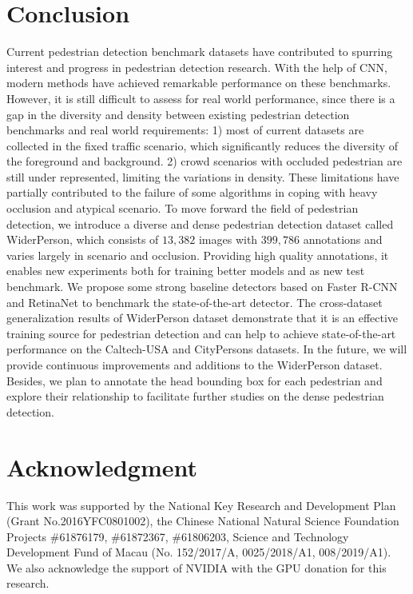 \documentclass[journal]{IEEEtran}
\begin{document}
\section{Conclusion} \label{6}
Current pedestrian detection benchmark datasets have contributed to spurring interest and progress in pedestrian detection research. With the help of CNN, modern methods have achieved remarkable performance on these benchmarks. However, it is still difficult to assess for real world performance, since there is a gap in the diversity and density between existing pedestrian detection benchmarks and real world requirements: 1) most of current datasets are collected in the fixed traffic scenario, which significantly reduces the diversity of the foreground and background. 2) crowd scenarios with occluded pedestrian are still under represented, limiting the variations in density. These limitations have partially contributed to the failure of some algorithms in coping with heavy occlusion and atypical scenario. To move forward the field of pedestrian detection, we introduce a diverse and dense pedestrian detection dataset called WiderPerson, which consists of $13,382$ images with $399,786$ annotations and varies largely in scenario and occlusion. Providing high quality annotations, it enables new experiments both for training better models and as new test benchmark. We propose some strong baseline detectors based on Faster R-CNN and RetinaNet to benchmark the state-of-the-art detector. The cross-dataset generalization results of WiderPerson dataset demonstrate that it is an effective training source for pedestrian detection and can help to achieve state-of-the-art performance on the Caltech-USA and CityPersons datasets. In the future, we will provide continuous improvements and additions to the WiderPerson dataset. Besides, we plan to annotate the head bounding box for each pedestrian and explore their relationship to facilitate further studies on the dense pedestrian detection.

\section*{Acknowledgment}
This work was supported by the National Key Research and Development Plan (Grant No.2016YFC0801002), the Chinese National Natural Science Foundation Projects $\#$61876179, $\#$61872367, $\#$61806203, Science and Technology Development Fund of Macau (No. 152/2017/A, 0025/2018/A1, 008/2019/A1). We also acknowledge the support of NVIDIA with the GPU donation for this research.


\ifCLASSOPTIONcaptionsoff
  \newpage
\fi



\end{document}
